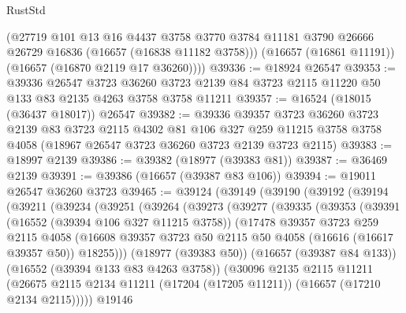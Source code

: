 \begin{lexlean}{RustStd}
\begin{coremodule}
        (@27719
          @101
          @13
          @16
          @4437
          @3758
          @3770
          @3784
          @11181
          @3790
          @26666
          @26729
          @16836
          (@16657 (@16838 @11182 @3758)))
        (@16657 (@16861 @11191))
        (@16657 (@16870 @2119 @17 @36260))))
@39336 := @18924 @26547
@39353 := @39336
    @26547
    @3723
    @36260
    @3723
    @2139
    @84
    @3723
    @2115
    @11220
    @50
    @133
    @83
    @2135
    @4263
    @3758
    @3758
    @11211
@39357 := @16524 (@18015 (@36437 @18017)) @26547
@39382 := @39336
    @39357
    @3723
    @36260
    @3723
    @2139
    @83
    @3723
    @2115
    @4302
    @81
    @106
    @327
    @259
    @11215
    @3758
    @3758
    @4058
    (@18967 @26547 @3723 @36260 @3723 @2139 @3723 @2115)
@39383 := @18997 @2139
@39386 := @39382 (@18977 (@39383 @81))
@39387 := @36469 @2139
@39391 := @39386 (@16657 (@39387 @83 @106))
@39394 := @19011 @26547 @36260 @3723
@39465 := @39124
    (@39149
      (@39190
        (@39192
          (@39194
            (@39211
              (@39234
                (@39251
                  (@39264
                    (@39273
                      (@39277
                        (@39335
                          (@39353
                            (@39391
                              (@16552 (@39394 @106 @327 @11215 @3758))
                              (@17478
                                @39357
                                @3723
                                @259
                                @2115
                                @4058
                                (@16608
                                  @39357
                                  @3723
                                  @50
                                  @2115
                                  @50
                                  @4058
                                  (@16616 (@16617 @39357 @50))
                                  @18255)))
                            (@18977 (@39383 @50))
                            (@16657 (@39387 @84 @133))
                            (@16552 (@39394 @133 @83 @4263 @3758))
                            (@30096
                              @2135
                              @2115
                              @11211
                              (@26675
                                @2115
                                @2134
                                @11211
                                (@17204 (@17205 @11211))
                                (@16657 (@17210 @2134 @2115)))))
                          @19146

\end{coremodule}
\end{lexlean}
